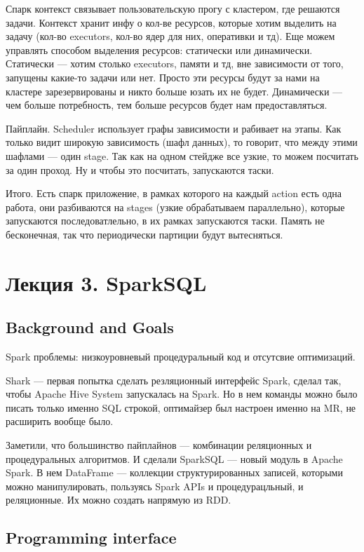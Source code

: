 \documentclass[12pt]{article}
\begin{document}
Спарк контекст связывает пользовательскую прогу с кластером, где решаются задачи. Контекст хранит инфу о кол-ве ресурсов, которые хотим выделить на задачу (кол-во executors, кол-во ядер для них, оперативки и тд). Еще можем управлять способом выделения ресурсов: статически или динамически. Статически --- хотим столько executors, памяти и тд, вне зависимости от того, запущены какие-то задачи или нет. Просто эти ресурсы будут за нами на кластере зарезервированы и никто больше юзать их не будет. Динамически --- чем больше потребность, тем больше ресурсов будет нам предоставляться.

Пайплайн. Scheduler использует графы зависимости и рабивает на этапы. Как только видит широкую зависимость (шафл данных), то говорит, что между этими шафлами --- один stage. Так как на одном стейдже все узкие, то можем посчитать за один проход. Ну и чтобы это посчитать, запускаются таски.

Итого. Есть спарк приложение, в рамках которого на каждый action есть одна работа, они разбиваются на stages (узкие обрабатываем параллельно), которые запускаются последоватлельно, в их рамках запускаются таски. Память не бесконечная, так что периодически партиции будут вытесняться.


\section{Лекция 3. SparkSQL}

\subsection{Background and Goals}

Spark проблемы: низкоуровневый процедуральный код и отсутсвие оптимизаций. 

Shark --- первая попытка сделать резляционный интерфейс Spark, сделал так, чтобы Apache Hive System запускалась на Spark. Но в нем команды можно было писать только именно SQL строкой, оптимайзер был настроен именно на MR, не расширить вообще было. 

Заметили, что большинство пайплайнов --- комбинации реляционных и процедуральных алгоритмов. И сделали SparkSQL --- новый модуль в Apache Spark. В нем DataFrame --- коллекции структурированных записей, которыми можно манипулировать, пользуясь Spark APIs и процедурацльный, и реляционные. Их можно создать напрямую из RDD.

\subsection{Programming interface}
\end{document}
